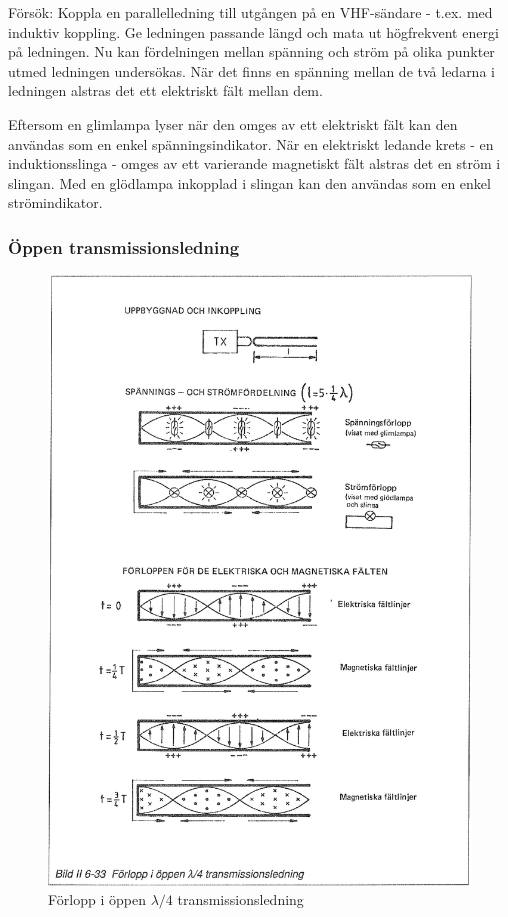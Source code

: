 Försök: Koppla en parallelledning till utgången på en VHF-sändare -
t.ex. med induktiv koppling. Ge ledningen passande längd och mata ut
högfrekvent energi på ledningen. Nu kan fördelningen mellan spänning
och ström på olika punkter utmed ledningen undersökas. När det finns
en spänning mellan de två ledarna i ledningen alstras det ett
elektriskt fält mellan dem.

Eftersom en glimlampa lyser när den omges av ett elektriskt fält kan
den användas som en enkel spänningsindikator.  När en elektriskt
ledande krets - en induktionsslinga - omges av ett varierande
magnetiskt fält alstras det en ström i slingan.  Med en glödlampa
inkopplad i slingan kan den användas som en enkel strömindikator.

\subsubsection{Öppen transmissionsledning}

\begin{figure}
  \includegraphics[width=\textwidth]{images/bild_2_6-33}
  \caption{Förlopp i öppen \(\lambda/4\) transmissionsledning}
  \label{fig:bildII6-33}
\end{figure}

